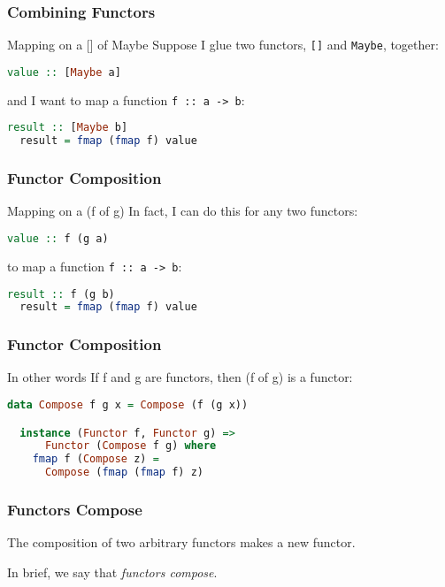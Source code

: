 \begin{frame}[fragile]
\frametitle{Combining Functors}
\begin{block}{Mapping on a [] of Maybe}
Suppose I glue two functors, \lstinline$[]$ and \lstinline$Maybe$, together:
\begin{lstlisting}[language=haskell]
  value :: [Maybe a]
\end{lstlisting}
and I want to map a function \lstinline$f :: a -> b$:
\begin{lstlisting}[language=haskell]
  result :: [Maybe b]
  result = fmap (fmap f) value
\end{lstlisting}
\end{block}
\end{frame}

\begin{frame}[fragile]
\frametitle{Functor Composition}
\begin{block}{Mapping on a (f of g)}
In fact, I can do this for any two functors:
\begin{lstlisting}[language=haskell]
  value :: f (g a)
\end{lstlisting}
to map a function \lstinline$f :: a -> b$:
\begin{lstlisting}[language=haskell]
  result :: f (g b)
  result = fmap (fmap f) value
\end{lstlisting}
\end{block}
\end{frame}

\begin{frame}[fragile]
\frametitle{Functor Composition}
\begin{block}{In other words}
If f and g are functors, then (f of g) is a functor:
\begin{lstlisting}[language=haskell]
  data Compose f g x = Compose (f (g x))

  instance (Functor f, Functor g) =>
      Functor (Compose f g) where
    fmap f (Compose z) =
      Compose (fmap (fmap f) z)
\end{lstlisting}
\end{block}
\end{frame}

\begin{frame}
\frametitle{Functors Compose}
The composition of two arbitrary functors makes a new functor.

In brief, we say that \emph{functors compose}.
\end{frame}
